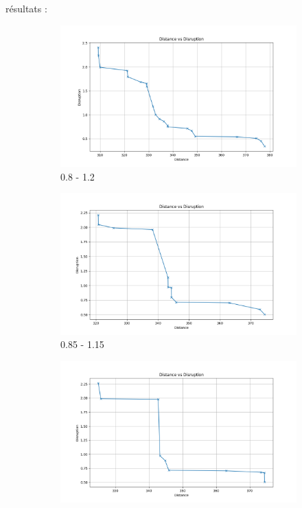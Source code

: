 \documentclass[12pt,a4paper]{article}
\begin{document}
résultats :

\begin{figure}[H]
    \centering
    \begin{subfigure}{0.32\textwidth}
        \centering
        \includegraphics[width=\textwidth]{figures/solve1-0.8.png}
        \caption{0.8 - 1.2}
        \label{fig:solve1}
    \end{subfigure}
    \hfill
    \begin{subfigure}{0.32\textwidth}
        \centering
        \includegraphics[width=\textwidth]{figures/solve1-0.85.png}
        \caption{0.85 - 1.15}
        \label{fig:solve2}
    \end{subfigure}
    \hfill
    \begin{subfigure}{0.32\textwidth}
        \centering
        \includegraphics[width=\textwidth]{figures/solve1-0.9.png}

\end{subfigure}
\end{figure}
\end{document}
